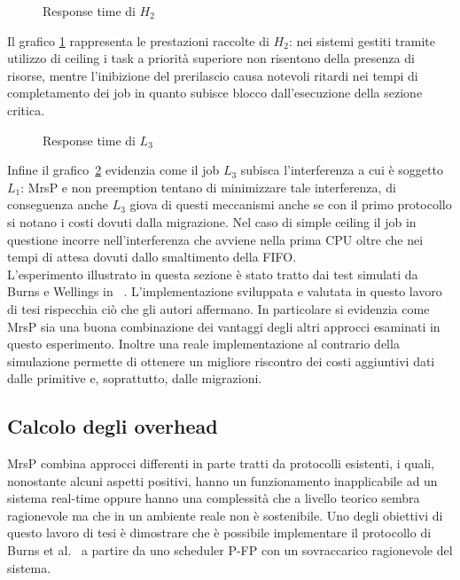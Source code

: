 \begin{figure}
  \centering
  \confrontoProtocolliHDue
  \caption{Response time di $H_2$}
  \label{fig:test_protocols_H2}
\end{figure}

\noindent Il grafico \ref{fig:test_protocols_H2} rappresenta le prestazioni raccolte di $H_2$: nei sistemi gestiti tramite utilizzo di ceiling i task a priorità superiore non risentono della presenza di risorse, mentre l'inibizione del prerilascio causa notevoli ritardi nei tempi di completamento dei job in quanto subisce blocco dall'esecuzione della sezione critica.\\

\begin{figure}
  \centering
  \confrontoProtocolliLTre
  \caption{Response time di $L_3$}
  \label{fig:test_protocols_L3}
\end{figure}

\noindent Infine il grafico~\ref{fig:test_protocols_L3} evidenzia come il job $L_3$ subisca l'interferenza a cui è soggetto $L_1$: MrsP e non preemption tentano di minimizzare tale interferenza, di conseguenza anche $L_3$ giova di questi meccanismi anche se con il primo protocollo si notano i costi dovuti dalla migrazione. Nel caso di simple ceiling il job in questione incorre nell'interferenza che avviene nella prima CPU oltre che nei tempi di attesa dovuti dallo smaltimento della FIFO.\\

\noindent L'esperimento illustrato in questa sezione è stato tratto dai test simulati da Burns e Wellings in ~\cite{Burns:2013:SCM:2547348.2547350}. L'implementazione sviluppata e valutata in questo lavoro di tesi rispecchia ciò che gli autori affermano. In particolare si evidenzia come MrsP sia una buona combinazione dei vantaggi degli altri approcci esaminati in questo esperimento. Inoltre una reale implementazione al contrario della simulazione permette di ottenere un migliore riscontro dei costi aggiuntivi dati dalle primitive e, soprattutto, dalle migrazioni.\\

\newpage

\subsection{Calcolo degli overhead}
\label{sec:overhead}

\noindent MrsP combina approcci differenti in parte tratti da protocolli esistenti, i quali, nonostante alcuni aspetti positivi, hanno un funzionamento inapplicabile ad un sistema real-time oppure hanno una complessità che a livello teorico sembra ragionevole ma che in un ambiente reale non è sostenibile. Uno degli obiettivi di questo lavoro di tesi è dimostrare che è possibile implementare il protocollo di Burns et al.~\cite{Burns:2013:SCM:2547348.2547350} a partire da uno scheduler P-FP con un sovraccarico ragionevole del sistema.

